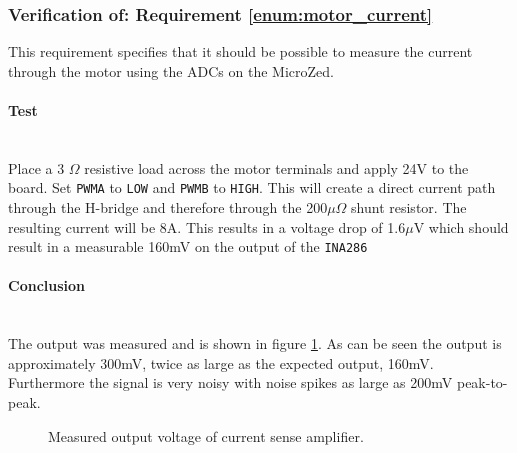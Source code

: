 \subsubsection{Verification of: Requirement \ref{enum:motor_current}} %
\label{ssub:requrement_enum:motor_current_}
This requirement specifies that it should be possible to measure the current through the motor using the ADCs on the MicroZed.

\paragraph{Test}~\\
Place a 3 $\Omega$ resistive load across the motor terminals and apply 24V to the board.
Set \texttt{PWMA} to \texttt{LOW} and \texttt{PWMB} to \texttt{HIGH}.
This will create a direct current path through the H-bridge and therefore through the 200$\mu\Omega$ shunt resistor.
The resulting current will be 8A.
This results in a voltage drop of 1.6$\mu$V which should result in a measurable 160mV on the output of the \texttt{INA286}

\paragraph{Conclusion}~\\
The output was measured and is shown in figure \ref{fig:controllerboardv2_current_sense}.
As can be seen the output is approximately 300mV, twice as large as the expected output, 160mV.
Furthermore the signal is very noisy with noise spikes as large as 200mV peak-to-peak. 

\begin{figure}[h]
\centering
%
\caption{Measured output voltage of current sense amplifier.}
\label{fig:controllerboardv2_current_sense}
\end{figure}

